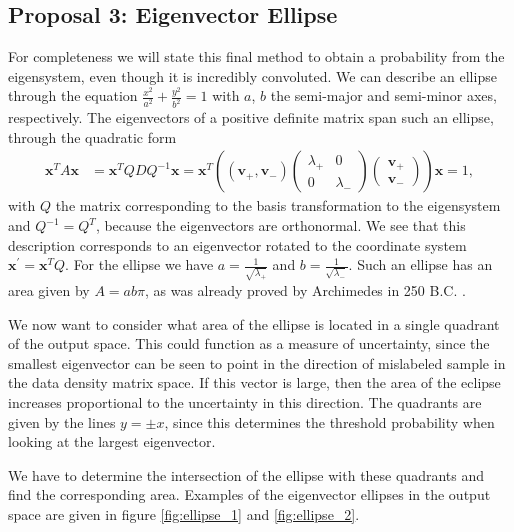 \subsection{Proposal 3: Eigenvector Ellipse}

For completeness we will state this final method to obtain a probability from the eigensystem, even though it is incredibly convoluted. We can describe an ellipse through the equation $\frac{x^2}{a^2} + \frac{y^2}{b^2} = 1$ with $a$, $b$ the semi-major and semi-minor axes, respectively. The eigenvectors of a positive definite matrix span such an ellipse, through the quadratic form
\begin{align*}
    \mathbf{x}^T A \mathbf{x} &= \mathbf{x}^T QDQ^{-1} \mathbf{x} =\mathbf{x}^T \left( 
    (\mathbf{v}_+, \mathbf{v}_-)
    \begin{pmatrix}
    \lambda_+ & 0\\
    0 & \lambda_-
    \end{pmatrix}
    \begin{pmatrix}
    \mathbf{v}_+\\
    \mathbf{v}_-
    \end{pmatrix}
    \right)\mathbf{x}=1,
\end{align*}
with $Q$ the matrix corresponding to the basis transformation to the eigensystem and $Q^{-1} = Q^T$, because the eigenvectors are orthonormal. We see that this description corresponds to an eigenvector rotated to the coordinate system $\mathbf{x}^\prime = \mathbf{x}^T Q$. For the ellipse we have $a = \frac{1}{\sqrt{\lambda_+}}$ and $b = \frac{1}{\sqrt{\lambda_-}}$. Such an ellipse has an area given by $A= ab\pi$, as was already proved by Archimedes in 250 B.C. \cite{Archimedes2009}.\newline

\noindent We now want to consider what area of the ellipse is located in a single quadrant of the output space. This could function as a measure of uncertainty, since the smallest eigenvector can be seen to point in the direction of mislabeled sample in the data density matrix space. If this vector is large, then the area of the eclipse increases proportional to the uncertainty in this direction. The quadrants are given by the lines $y=\pm x$, since this determines the threshold probability when looking at the largest eigenvector. \newline

\noindent We have to determine the intersection of the ellipse with these quadrants and find the corresponding area. Examples of the eigenvector ellipses in the output space are given in figure \ref{fig:ellipse_1} and \ref{fig:ellipse_2}.

